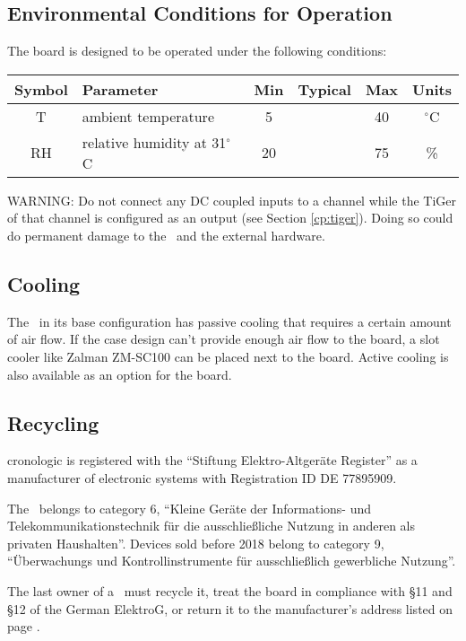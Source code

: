 \subsection{Environmental Conditions for Operation}

	The board is designed to be operated under the following conditions:

	\noindent
	\begin{tabularx}{\textwidth}{|c|X|c|c|c|c|}
		\hline
		Symbol & Parameter & Min & Typical & Max & Units\\
		\hline\hline
		T & ambient temperature & 5 && 40 & $^{\circ}$C\\
		\hline
		RH & relative humidity at 31$^{\circ}$C & 20 && 75 & \%\\
		\hline
	\end{tabularx}

	WARNING: Do not connect any DC coupled inputs to a channel while the TiGer of that channel is configured as an output (see Section \ref{cp:tiger}).
	Doing so could do permanent damage to the \deviceName\ and the external hardware.

\subsection{Cooling}

	The \deviceName\ in its base configuration has passive cooling that requires a certain amount of air flow. 
	If the case design can't provide enough air flow to the board, a slot cooler like Zalman ZM-SC100 can be placed next to the board. 
	Active cooling is also available as an option for the board.


\subsection{Recycling}

	cronologic is registered with the ``Stiftung Elektro-Altger\"a{}te Register'' as a manufacturer of electronic systems with Registration ID DE 77895909.\par
	The \deviceName\ belongs to category 6, ``Kleine Geräte der Informations- und Telekommunikationstechnik für die ausschließliche Nutzung in anderen als privaten Haushalten''. 
	Devices sold before 2018 belong to category 9, ``\"U{}berwachungs und Kontrollinstrumente f\"u{}r aus\-schlie\ss lich gewerbliche Nutzung''. 
	
	The last owner of a \deviceName\ must recycle it, treat the board in compliance with \S{}11 and \S{}12 of the German ElektroG, or return it to the manufacturer's address listed on page \pageref{cp:manu}.
	